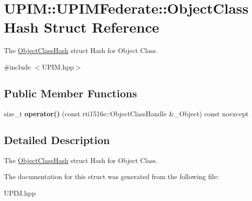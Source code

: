 \hypertarget{structUPIM_1_1UPIMFederate_1_1ObjectClassHash}{}\section{U\+P\+IM\+:\+:U\+P\+I\+M\+Federate\+:\+:Object\+Class\+Hash Struct Reference}
\label{structUPIM_1_1UPIMFederate_1_1ObjectClassHash}


The \hyperlink{structUPIM_1_1UPIMFederate_1_1ObjectClassHash}{Object\+Class\+Hash} struct Hash for Object Class.  




{\ttfamily \#include $<$U\+P\+I\+M.\+hpp$>$}

\subsection*{Public Member Functions}
\begin{DoxyCompactItemize}
\item 
\mbox{\label{structUPIM_1_1UPIMFederate_1_1ObjectClassHash_a68d00d3b2c531bbc96fc8fa41fbdd5a0}} 
size\+\_\+t {\bfseries operator()} (const rti1516e\+::\+Object\+Class\+Handle \&\+\_\+\+Object) const noexcept
\end{DoxyCompactItemize}


\subsection{Detailed Description}
The \hyperlink{structUPIM_1_1UPIMFederate_1_1ObjectClassHash}{Object\+Class\+Hash} struct Hash for Object Class. 

The documentation for this struct was generated from the following file\+:\begin{DoxyCompactItemize}
\item 
U\+P\+I\+M.\+hpp\end{DoxyCompactItemize}
